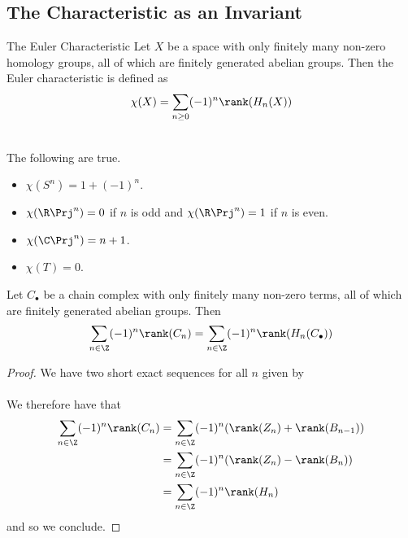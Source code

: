 \documentclass[a4paper]{article}
\begin{document}
\subsection{The Characteristic as an Invariant}
\begin{defn}{The Euler Characteristic}{} Let $X$ be a space with only finitely many non-zero homology groups, all of which are finitely generated abelian groups. Then the Euler characteristic is defined as $$\chi(X)=\sum_{n\geq 0}(-1)^n\rank(H_n(X))$$
\end{defn}

\begin{eg}{}{}\\
The following are true. 
\begin{itemize}
\item $\chi(S^n)=1+(-1)^n$. 
\item $\chi(\R\Prj^n)=0$ if $n$ is odd and $\chi(\R\Prj^n)=1$ if $n$ is even. 
\item $\chi(\C\Prj^n)=n+1$. 
\item $\chi(T)=0$. 
\end{itemize}
\end{eg}

\begin{lmm}{}{} Let $C_\bullet$ be a chain complex with only finitely many non-zero terms, all of which are finitely generated abelian groups. Then $$\sum_{n\in\Z}(-1)^n\rank(C_n)=\sum_{n\in\Z}(-1)^n\rank(H_n(C_\bullet))$$ 
\begin{proof}
We have two short exact sequences for all $n$ given by \\
\\
We therefore have that 
\begin{align*}
\sum_{n\in\Z}(-1)^n\rank(C_n)&=\sum_{n\in\Z}(-1)^n(\rank(Z_n)+\rank(B_{n-1}))\\
&=\sum_{n\in\Z}(-1)^n(\rank(Z_n)-\rank(B_n))\\
&=\sum_{n\in\Z}(-1)^n\rank(H_n)
\end{align*}
and so we conclude. 
\end{proof}
\end{lmm}
\end{document}
